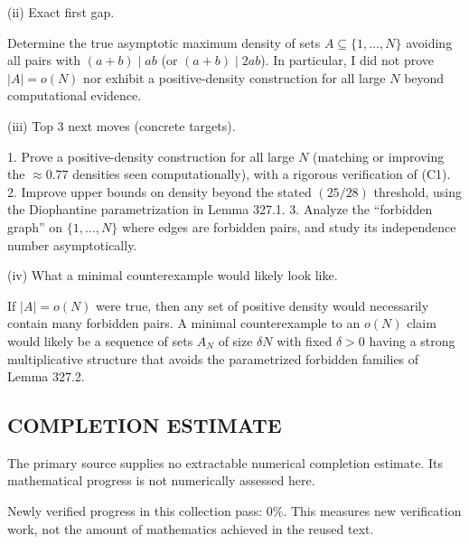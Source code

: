 (ii) Exact first gap.

Determine the true asymptotic maximum density of sets $A\subseteq\{1,\dots,N\}$ avoiding all pairs with $(a+b)\mid ab$ (or $(a+b)\mid 2ab$). In particular, I did not prove $|A|=o(N)$ nor exhibit a positive-density construction for all large $N$ beyond computational evidence.

(iii) Top 3 next moves (concrete targets).

1. Prove a positive-density construction for all large $N$ (matching or improving the $\approx 0.77$ densities seen computationally), with a rigorous verification of (C1).
2. Improve upper bounds on density beyond the stated $(25/28)$ threshold, using the Diophantine parametrization in Lemma 327.1.
3. Analyze the ``forbidden graph'' on $\{1,\dots,N\}$ where edges are forbidden pairs, and study its independence number asymptotically.

(iv) What a minimal counterexample would likely look like.

If $|A|=o(N)$ were true, then any set of positive density would necessarily contain many forbidden pairs.
A minimal counterexample to an $o(N)$ claim would likely be a sequence of sets $A_N$ of size $\delta N$ with fixed $\delta>0$ having a strong multiplicative structure that avoids the parametrized forbidden families of Lemma 327.2.




\subsection*{COMPLETION ESTIMATE}
The primary source supplies no extractable numerical completion estimate. Its mathematical progress is not numerically assessed here.

Newly verified progress in this collection pass: $0\%$. This measures new verification work, not the amount of mathematics achieved in the reused text.
